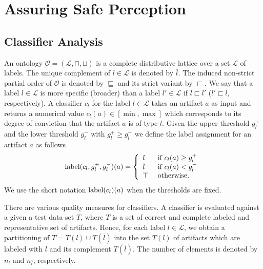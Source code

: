 \section{Assuring Safe Perception}\label{sec:proofrule}
\subsection{Classifier Analysis}
An ontology $\mathcal O=(\mathcal L,\sqcap,\sqcup)$ is a complete distributive lattice over a set $\mathcal L$ of labels. The unique complement of $l\in\mathcal L$ is denoted by $\overline l$. The induced non-strict partial order of $\mathcal O$ is denoted by $\sqsubseteq$ and its strict variant by $\sqsubset$. We say that a label $l\in\mathcal L$ is more specific (broader) than a label $l'\in\mathcal L$ if $l\sqsubset l'$ ($l'\sqsubset l$, respectively). A classifier $c_l$ for the label $l\in\mathcal L$ takes an artifact $a$ as input and returns a numerical value $c_l(a) \in [\min,\max]$ which corresponds to its degree of conviction that the artifact $a$ is of type $l$.
Given the upper threshold $g_l^+$ and the lower threshold $g_l^-$ with $g_l^+\geq g_l^-$ we define the label assignment for an artifact $a$ as follows
\begin{gather*}
    \mathrm{label}(c_l,g_l^+,g_l^-)(a) = \left\{
    \begin{array}{ll}
    l & \text{ if } c_l(a) \geq g_l^+\\
    \overline l & \text{ if } c_l(a) < g_l^-\\
    \top & \text{ otherwise.}
    \end{array}\right.
\end{gather*}
We use the short notation $\mathrm{label}(c_l)(a)$ when the thresholds are fixed. 

There are various quality measures for classifiers. A classifier is evaluated against a given a test data set $T$, where $T$ is a set of correct and complete labeled and representative set of artifacts. Hence, for each label $l\in\mathcal L$, we obtain a partitioning of $T=T(l) \cup T(\overline l)$ into the set $T(l)$ of artifacts which are labeled with $l$ and its complement $T(\overline l)$. The number of elements is denoted by $n_l$ and $n_{\overline l}$, respectively.

